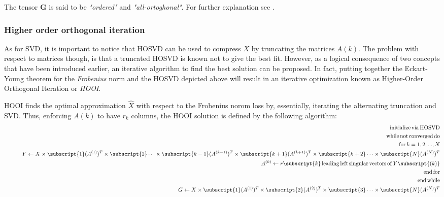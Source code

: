 The tensor $\mathbf{G}$ is said to be \emph{"ordered"} and \emph{"all-ortoghonal"}. For further explanation see \parencite{multilinear}. 

\subsubsection{Higher order orthogonal iteration}
As for SVD, it is important to notice that HOSVD can be used to compress $X$ by truncating the matrices $A(k)$. The problem with respect to matrices though, is that a truncated HOSVD is known not to give the best fit. However, as a logical consequence of two concepts that have been introduced earlier, an iterative algorithm to find the best solution can be proposed.
\newline
In fact, putting together the Eckart-Young theorem for the \emph{Frobenius} norm and the HOSVD depicted above will result in an iterative optimization known as Higher-Order Orthogonal Iteration or \emph{HOOI}. 
\newline

HOOI finds the optimal approximation $\hat{X}$ with respect to the Frobenius norom loss by, essentially, iterating the alternating truncation and SVD. Thus, enforcing $A(k)$ to have $r_k$ columns, the HOOI solution is defined by the following algorithm: 
\begin{eqnarray}
&\,&\mathrm{initialize\,via\,HOSVD} \nonumber\\
&\,&\mathrm{while\,not\,converged\,do} \nonumber\\
&\,&\quad \mathrm{for}\, k = 1, 2, ..., N \nonumber\\
&\,&\quad\quad Y \leftarrow X \times\subscript{1} (A^{(1)})^T \times\subscript{2} \cdots \times\subscript{k-1} (A^{(k-1)})^T \times\subscript{k+1} (A^{(k+1)})^T \times\subscript{k+2} \cdots \times\subscript{N} (A^{(N)})^T  \nonumber\\
&\,&\quad\quad A^{(k)} \leftarrow r\subscript{k}\,\mathrm{leading\,left\,singular\,vectors\,of}\,Y\subscript{(k)} \nonumber\\
&\,&\quad \mathrm{end\,for} \nonumber\\
&\,&\mathrm{end\,while} \nonumber\\
&\,&G \leftarrow X \times\subscript{1} (A^{(1)})^T \times\subscript{2} (A^{(2)})^T \times\subscript{3} \cdots \times\subscript{N} (A^{(N)})^T  \nonumber\\
\end{eqnarray}


